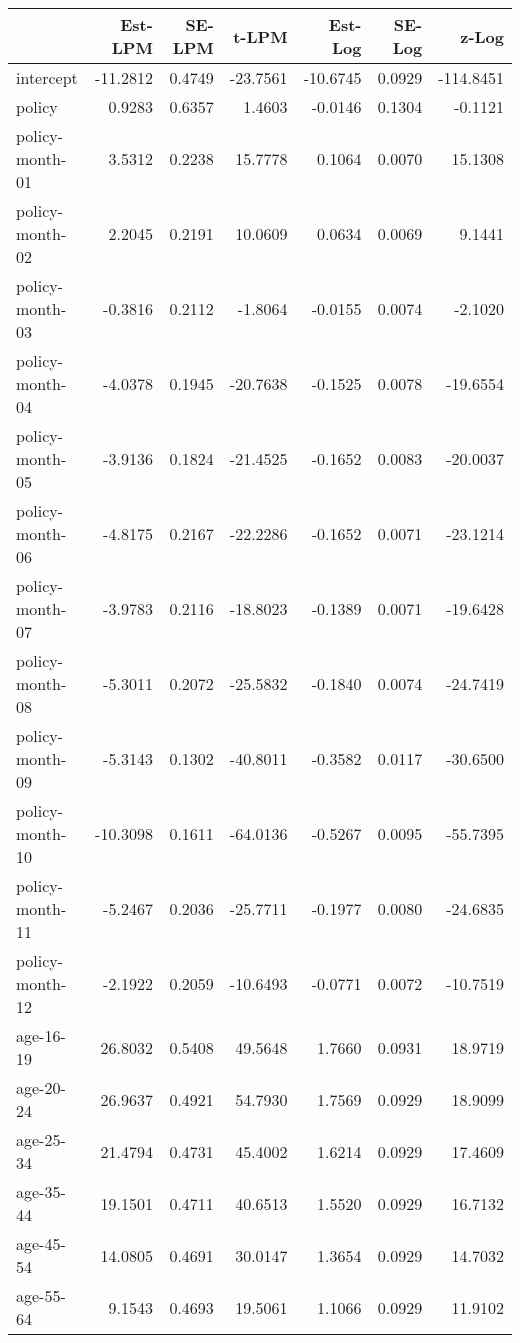 \documentclass[10pt]{article}
\begin{document}
\begin{table}[ht]
\centering
\begin{tabular}{lrrrrrr}
  \hline
 & Est-LPM & SE-LPM & t-LPM & Est-Log & SE-Log & z-Log \\ 
  \hline
intercept & -11.2812 & 0.4749 & -23.7561 & -10.6745 & 0.0929 & -114.8451 \\ 
  policy & 0.9283 & 0.6357 & 1.4603 & -0.0146 & 0.1304 & -0.1121 \\ 
  policy-month-01 & 3.5312 & 0.2238 & 15.7778 & 0.1064 & 0.0070 & 15.1308 \\ 
  policy-month-02 & 2.2045 & 0.2191 & 10.0609 & 0.0634 & 0.0069 & 9.1441 \\ 
  policy-month-03 & -0.3816 & 0.2112 & -1.8064 & -0.0155 & 0.0074 & -2.1020 \\ 
  policy-month-04 & -4.0378 & 0.1945 & -20.7638 & -0.1525 & 0.0078 & -19.6554 \\ 
  policy-month-05 & -3.9136 & 0.1824 & -21.4525 & -0.1652 & 0.0083 & -20.0037 \\ 
  policy-month-06 & -4.8175 & 0.2167 & -22.2286 & -0.1652 & 0.0071 & -23.1214 \\ 
  policy-month-07 & -3.9783 & 0.2116 & -18.8023 & -0.1389 & 0.0071 & -19.6428 \\ 
  policy-month-08 & -5.3011 & 0.2072 & -25.5832 & -0.1840 & 0.0074 & -24.7419 \\ 
  policy-month-09 & -5.3143 & 0.1302 & -40.8011 & -0.3582 & 0.0117 & -30.6500 \\ 
  policy-month-10 & -10.3098 & 0.1611 & -64.0136 & -0.5267 & 0.0095 & -55.7395 \\ 
  policy-month-11 & -5.2467 & 0.2036 & -25.7711 & -0.1977 & 0.0080 & -24.6835 \\ 
  policy-month-12 & -2.1922 & 0.2059 & -10.6493 & -0.0771 & 0.0072 & -10.7519 \\ 
  age-16-19 & 26.8032 & 0.5408 & 49.5648 & 1.7660 & 0.0931 & 18.9719 \\ 
  age-20-24 & 26.9637 & 0.4921 & 54.7930 & 1.7569 & 0.0929 & 18.9099 \\ 
  age-25-34 & 21.4794 & 0.4731 & 45.4002 & 1.6214 & 0.0929 & 17.4609 \\ 
  age-35-44 & 19.1501 & 0.4711 & 40.6513 & 1.5520 & 0.0929 & 16.7132 \\ 
  age-45-54 & 14.0805 & 0.4691 & 30.0147 & 1.3654 & 0.0929 & 14.7032 \\ 
  age-55-64 & 9.1543 & 0.4693 & 19.5061 & 1.1066 & 0.0929 & 11.9102 \\ 

\end{tabular}
\end{table}
\end{document}
